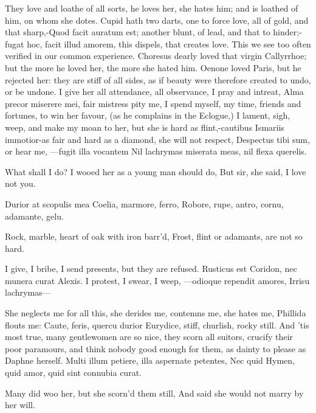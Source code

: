 {They love and loathe of all sorts, he loves her, she hates him; and is
loathed of him, on whom she dotes. Cupid hath two darts, one to force
love, all of gold, and that sharp,-Quod facit auratum est;
another blunt, of lead, and that to hinder;-fugat hoc, facit illud
amorem, this dispels, that creates love. This we see too often verified
in our common experience. Choresus dearly loved that virgin
Callyrrhoe; but the more he loved her, the more she hated him. Oenone
loved Paris, but he rejected her: they are stiff of all sides, as if
beauty were therefore created to undo, or be undone. I give her all
attendance, all observance, I pray and intreat, Alma precor
miserere mei, fair mistress pity me, I spend myself, my time, friends
and fortunes, to win her favour, (as he complains in the
Eclogue,) I lament, sigh, weep, and make my moan to her, but she
is hard as flint,-cautibus Ismariis immotior-as fair and hard as a
diamond, she will not respect, Despectus tibi sum, or hear me,
---fugit illa vocantem
Nil lachrymas miserata meas, nil flexa querelis.

What shall I do?
I wooed her as a young man should do,
But sir, she said, I love not you.

Durior at scopulis mea Coelia, marmore, ferro,
Robore, rupe, antro, cornu, adamante, gelu.

Rock, marble, heart of oak with iron barr'd,
Frost, flint or adamants, are not so hard.

I give, I bribe, I send presents, but they are refused. Rusticus
est Coridon, nec munera curat Alexis. I protest, I swear, I weep,
 ---odioque rependit amores,
Irrisu lachrymas---

She neglects me for all this, she derides me, contemns me, she hates
me, Phillida flouts me: Caute, feris, quercu durior Eurydice, stiff,
churlish, rocky still.
And 'tis most true, many gentlewomen are so nice, they scorn all
suitors, crucify their poor paramours, and think nobody good enough for
them, as dainty to please as Daphne herself.
Multi illum petiere, illa aspernate petentes,
Nec quid Hymen, quid amor, quid sint connubia curat.

Many did woo her, but she scorn'd them still,
And said she would not marry by her will.

}
